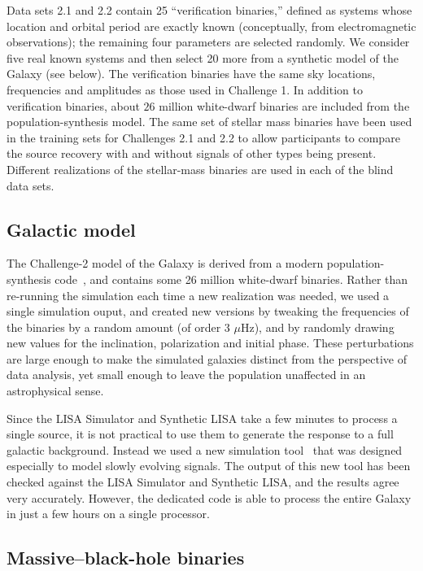 \documentclass{iopart}
\begin{document}
Data sets 2.1 and 2.2 contain 25 ``verification binaries,'' defined as systems whose location and orbital period are exactly known (conceptually, from electromagnetic observations); the remaining four parameters are selected randomly. We consider five real known systems and then select 20 more from a synthetic model of the Galaxy (see below). The verification binaries have the same sky locations, frequencies and amplitudes as those used in Challenge 1. In addition to verification binaries, about $26$ million
white-dwarf binaries are included from the population-synthesis model. The same set of stellar mass binaries have been used in the training sets for Challenges 2.1 and 2.2 to allow participants to compare the source recovery with and without signals of other types being present. Different realizations of the stellar-mass binaries are used in each of the blind data sets.

\subsection{Galactic model}
\label{ss:galaxy}

The Challenge-2 model of the Galaxy is derived from a modern population-synthesis code~\cite{gijs}, and contains some 26 million white-dwarf binaries. Rather than re-running the simulation each time a new realization was needed, we used a single simulation ouput, and created
new versions by tweaking the frequencies of the binaries by a random amount (of order 3 $\mu$Hz),
and by randomly drawing new values for the inclination, polarization and initial phase. These perturbations are large enough to make the
simulated galaxies distinct from the perspective of data analysis, yet small enough to leave the population unaffected in an astrophysical sense. 

Since the LISA Simulator and Synthetic LISA take a few minutes to process a single source, it is not practical to use them to generate the response to a full galactic background. Instead we used a new simulation tool~\cite{cornishlittenberg} that was designed especially to model slowly evolving signals. The output of this new tool has been checked against the LISA Simulator and Synthetic LISA, and the results agree very accurately. However, the dedicated code is able to process the entire Galaxy in just a few hours on a single processor.

\subsection{Massive--black-hole binaries}
\end{document}
